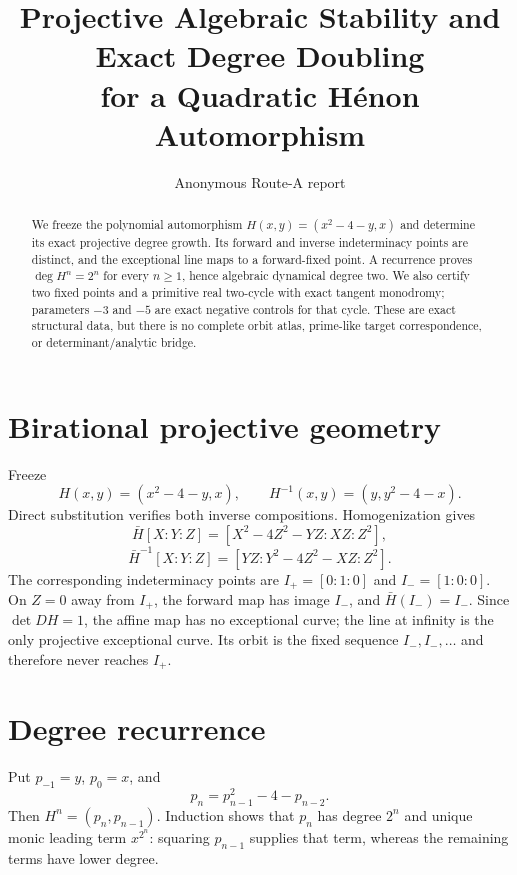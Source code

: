 \documentclass[10pt]{article}
\title{Projective Algebraic Stability and Exact Degree Doubling\\
for a Quadratic H\'enon Automorphism}
\author{Anonymous Route-A report}
\date{}
\begin{document}
\maketitle

\begin{abstract}
We freeze the polynomial automorphism
$H(x,y)=(x^2-4-y,x)$ and determine its exact projective degree growth.  Its
forward and inverse indeterminacy points are distinct, and the exceptional
line maps to a forward-fixed point.  A recurrence proves
$\deg H^n=2^n$ for every $n\geq1$, hence algebraic dynamical degree two.
We also certify two fixed points and a primitive real two-cycle with exact
tangent monodromy; parameters $-3$ and $-5$ are exact negative controls for
that cycle.  These are exact structural data, but there is no complete orbit
atlas, prime-like target correspondence, or determinant/analytic bridge.
\end{abstract}

\section{Birational projective geometry}
Freeze
\[
 H(x,y)=(x^2-4-y,x),\qquad H^{-1}(x,y)=(y,y^2-4-x).
\]
Direct substitution verifies both inverse compositions.  Homogenization gives
\[
 \bar H[X:Y:Z]=[X^2-4Z^2-YZ:XZ:Z^2],
\]
\[
 \bar H^{-1}[X:Y:Z]=[YZ:Y^2-4Z^2-XZ:Z^2].
\]
The corresponding indeterminacy points are
$I_+=[0:1:0]$ and $I_-=[1:0:0]$.  On $Z=0$ away from $I_+$, the forward map
has image $I_-$, and $\bar H(I_-)=I_-$.  Since $\det DH=1$, the affine map
has no exceptional curve; the line at infinity is the only projective
exceptional curve.  Its orbit is the fixed sequence $I_-,I_-,\ldots$ and
therefore never reaches $I_+$.

\section{Degree recurrence}
Put $p_{-1}=y$, $p_0=x$, and
\[
 p_n=p_{n-1}^2-4-p_{n-2}.
\]
Then $H^n=(p_n,p_{n-1})$.  Induction shows that $p_n$ has degree $2^n$ and
unique monic leading term $x^{2^n}$: squaring $p_{n-1}$ supplies that term,
whereas the remaining terms have lower degree.
\end{document}
